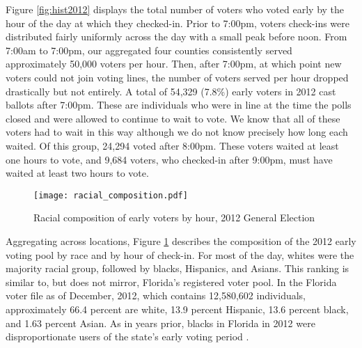 \documentclass[12pt,titlepage]{article}
\begin{document}
Figure \ref{fig:hist2012} displays the total number of voters who
voted early by the hour of the day at which they checked-in. Prior to
7:00pm, voters check-ins were distributed fairly uniformly across the
day with a small peak before noon.  From 7:00am to 7:00pm, our
aggregated four counties consistently served approximately 50,000
voters per hour. Then, after 7:00pm, at which point new voters could
not join voting lines, the number of voters served per hour dropped
drastically but not entirely.  A total of 54,329 (7.8\%) early voters
in 2012 cast ballots after 7:00pm. These are individuals who were in
line at the time the polls closed and were allowed to continue to wait
to vote.  We know that all of these voters had to wait in this way
although we do not know precisely how long each waited.  Of this
group, 24,294 voted after 8:00pm.  These voters waited at least one
hours to vote, and 9,684 voters, who checked-in after 9:00pm, must
have waited at least two hours to vote.




\begin{figure}[!ht]
\caption{Racial composition of early voters by hour, 2012 General Election}
  \label{fig:race2012}
  \centering
    \centering\texttt{[image: racial\_composition.pdf]}
\end{figure}

Aggregating across locations, Figure \ref{fig:race2012} describes the
composition of the 2012 early voting pool by race and by hour of
check-in.  For most of the day, whites were the majority racial group,
followed by blacks, Hispanics, and Asians.  This ranking is similar
to, but does not mirror, Florida's registered voter pool.  In the
Florida voter file as of December, 2012, which contains 12,580,602
individuals, approximately 66.4 percent are white, 13.9 percent
Hispanic, 13.6 percent black, and 1.63 percent Asian.  As in years
prior, blacks in Florida in 2012 were disproportionate users of the
state's early voting period \citep{herronsmith:souls}.

\end{document}

